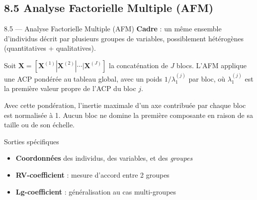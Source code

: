\subsection{8.5 Analyse Factorielle Multiple (AFM)}
\begin{frame}{8.5 — Analyse Factorielle Multiple (AFM)}
\textbf{Cadre} : un même ensemble d'individus décrit par
\alert{plusieurs groupes} de variables, possiblement hétérogènes
(quantitatives + qualitatives).

\begin{definition}
Soit $\mathbf{X} = [\mathbf{X}^{(1)} | \mathbf{X}^{(2)} | \cdots | \mathbf{X}^{(J)}]$
la concaténation de $J$ blocs. L'AFM applique une ACP \alert{pondérée}
au tableau global, avec un poids $1/\lambda_1^{(j)}$ par bloc, où
$\lambda_1^{(j)}$ est la première valeur propre de l'ACP du bloc $j$.
\end{definition}

\begin{theorem}[Équilibrage]
Avec cette pondération, l'inertie maximale d'un axe contribuée par chaque bloc
est \alert{normalisée à 1}. Aucun bloc ne domine la première composante
en raison de sa taille ou de son échelle.
\end{theorem}

\begin{block}{Sorties spécifiques}
\begin{itemize}\small
  \item \textbf{Coordonnées} des individus, des variables, et des \emph{groupes}
  \item \textbf{RV-coefficient} : mesure d'accord entre 2 groupes
  \item \textbf{Lg-coefficient} : généralisation au cas multi-groupes
\end{itemize}
\end{block}
\end{frame}

